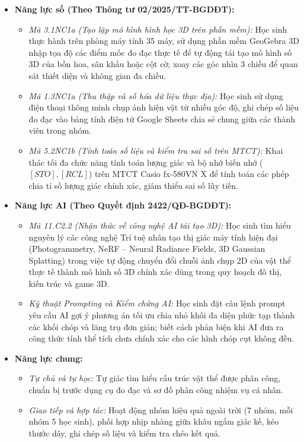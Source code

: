 \documentclass[12pt, a4paper]{article}
\begin{document}
\begin{itemize}[leftmargin=1.2cm]
    \item \textbf{Năng lực số (Theo Thông tư 02/2025/TT-BGDĐT):}
    \begin{itemize}[leftmargin=0.6cm]
        \item \textit{Mã 3.1NC1a (Tạo lập mô hình hình học 3D trên phần mềm):} Học sinh thực hành trên phòng máy tính 35 máy, sử dụng phần mềm GeoGebra 3D nhập tọa độ các điểm mốc đo đạc thực tế để tự động tái tạo mô hình số 3D của bồn hoa, sân khấu hoặc cột cờ; xoay các góc nhìn 3 chiều để quan sát thiết diện và không gian đa chiều.
        \item \textit{Mã 1.3NC1a (Thu thập và số hóa dữ liệu thực địa):} Học sinh sử dụng điện thoại thông minh chụp ảnh hiện vật từ nhiều góc độ, ghi chép số liệu đo đạc vào bảng tính điện tử Google Sheets chia sẻ chung giữa các thành viên trong nhóm.
        \item \textit{Mã 5.2NC1b (Tính toán số liệu và kiểm tra sai số trên MTCT):} Khai thác tối đa chức năng tính toán lượng giác và bộ nhớ biến nhớ ($[STO], [RCL]$) trên MTCT Casio fx-580VN X để tính toán các phép chia tỉ số lượng giác chính xác, giảm thiểu sai số lũy tiến.
    \end{itemize}

    \item \textbf{Năng lực AI (Theo Quyết định 2422/QĐ-BGDĐT):}
    \begin{itemize}[leftmargin=0.6cm]
        \item \textit{Mã 11.C2.2 (Nhận thức về công nghệ AI tái tạo 3D):} Học sinh tìm hiểu nguyên lý các công nghệ Trí tuệ nhân tạo thị giác máy tính hiện đại (Photogrammetry, NeRF -- Neural Radiance Fields, 3D Gaussian Splatting) trong việc tự động chuyển đổi chuỗi ảnh chụp 2D của vật thể thực tế thành mô hình số 3D chính xác dùng trong quy hoạch đô thị, kiến trúc và game 3D.
        \item \textit{Kỹ thuật Prompting và Kiểm chứng AI:} Học sinh đặt câu lệnh prompt yêu cầu AI gợi ý phương án tối ưu chia nhỏ khối đa diện phức tạp thành các khối chóp và lăng trụ đơn giản; biết cách phản biện khi AI đưa ra công thức tính thể tích chưa chính xác cho các hình chóp cụt không đều.
    \end{itemize}

    \item \textbf{Năng lực chung:}
    \begin{itemize}[leftmargin=0.6cm]
        \item \textit{Tự chủ và tự học:} Tự giác tìm hiểu cấu trúc vật thể được phân công, chuẩn bị trước dụng cụ đo đạc và sơ đồ phân công nhiệm vụ cá nhân.
        \item \textit{Giao tiếp và hợp tác:} Hoạt động nhóm hiệu quả ngoài trời (7 nhóm, mỗi nhóm 5 học sinh), phối hợp nhịp nhàng giữa khâu ngắm giác kế, kéo thước dây, ghi chép số liệu và kiểm tra chéo kết quả.
    \end{itemize}
\end{itemize}
\end{document}
